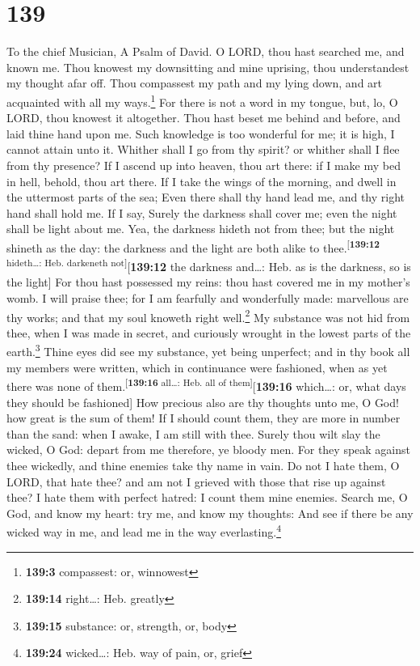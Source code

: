 \hypertarget{section-140}{%
\section{139}\label{section-140}}

To the chief Musician, A Psalm of David.  O LORD, thou
hast searched me, and known me.  Thou knowest my
downsitting and mine uprising, thou understandest my thought afar off.
 Thou compassest my path and my lying down, and art
acquainted with all my ways.\footnote{\textbf{139:3} compassest: or,
  winnowest}  For there is not a word in my tongue, but,
lo, O LORD, thou knowest it altogether.  Thou hast beset
me behind and before, and laid thine hand upon me.  Such
knowledge is too wonderful for me; it is high, I cannot attain unto it.
 Whither shall I go from thy spirit? or whither shall I
flee from thy presence?  If I ascend up into heaven, thou
art there: if I make my bed in hell, behold, thou art there.
 If I take the wings of the morning, and dwell in the
uttermost parts of the sea;  Even there shall thy hand
lead me, and thy right hand shall hold me.  If I say,
Surely the darkness shall cover me; even the night shall be light about
me.  Yea, the darkness hideth not from thee; but the
night shineth as the day: the darkness and the light are both alike to
thee.\textsuperscript{{[}\textbf{139:12} hideth\ldots: Heb. darkeneth
not{]}}{[}\textbf{139:12} the darkness and\ldots: Heb. as is the
darkness, so is the light{]}  For thou hast possessed my
reins: thou hast covered me in my mother's womb.  I will
praise thee; for I am fearfully and wonderfully made: marvellous are thy
works; and that my soul knoweth right well.\footnote{\textbf{139:14}
  right\ldots: Heb. greatly}  My substance was not hid
from thee, when I was made in secret, and curiously wrought in the
lowest parts of the earth.\footnote{\textbf{139:15} substance: or,
  strength, or, body}  Thine eyes did see my substance,
yet being unperfect; and in thy book all my members were written, which
in continuance were fashioned, when as yet there was none of
them.\textsuperscript{{[}\textbf{139:16} all\ldots: Heb. all of
them{]}}{[}\textbf{139:16} which\ldots: or, what days they should be
fashioned{]}  How precious also are thy thoughts unto me,
O God! how great is the sum of them!  If I should count
them, they are more in number than the sand: when I awake, I am still
with thee.  Surely thou wilt slay the wicked, O God:
depart from me therefore, ye bloody men.  For they speak
against thee wickedly, and thine enemies take thy name in vain.
 Do not I hate them, O LORD, that hate thee? and am not I
grieved with those that rise up against thee?  I hate
them with perfect hatred: I count them mine enemies. 
Search me, O God, and know my heart: try me, and know my thoughts:
 And see if there be any wicked way in me, and lead me in
the way everlasting.\footnote{\textbf{139:24} wicked\ldots: Heb. way of
  pain, or, grief}

